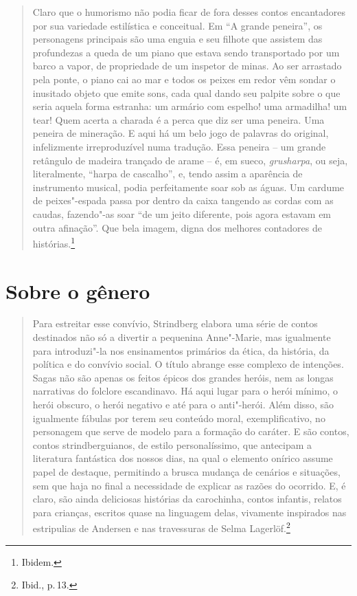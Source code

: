 \begin{quote}
Claro que o humorismo não podia ficar de fora desses contos encantadores
por sua variedade estilística e conceitual. Em ``A grande
peneira'', os personagens principais são uma enguia e seu filhote que
assistem das profundezas a queda de um piano que estava sendo
transportado por um barco a vapor, de propriedade de um inspetor de
minas. Ao ser arrastado pela ponte, o piano cai ao mar e todos os
peixes em redor vêm sondar o inusitado objeto que emite sons, cada qual
dando seu palpite sobre o que seria aquela forma estranha: um armário
com espelho! uma armadilha! um tear! Quem acerta a charada é a perca
que diz ser uma peneira. Uma peneira de mineração. E aqui há um belo
jogo de palavras do original, infelizmente irreproduzível numa
tradução. Essa peneira -- um grande retângulo de madeira trançado
de arame -- é, em sueco, \textit{grusharpa}, ou seja, literalmente,
``harpa de cascalho'', e, tendo assim a aparência de instrumento musical,
podia perfeitamente soar sob as águas. Um cardume de peixes"-espada
passa por dentro da caixa tangendo as cordas com as caudas,
fazendo"-as soar ``de um jeito diferente, pois agora estavam em outra
afinação''. Que bela imagem, digna dos melhores contadores de
histórias.\footnote{Ibidem.}
\end{quote}


\section{Sobre o gênero}

\begin{quote}
Para estreitar esse convívio, Strindberg elabora uma série de contos
destinados não só a divertir a pequenina Anne"-Marie, mas igualmente
para introduzi"-la nos ensinamentos primários da ética, da história,
da política e do convívio social. O título abrange esse complexo de
intenções. Sagas não são apenas os feitos épicos dos grandes heróis,
nem as longas narrativas do folclore escandinavo. Há aqui lugar para o
herói mínimo, o herói obscuro, o herói negativo e até para o
anti"-herói. Além disso, são igualmente fábulas por terem seu conteúdo
moral, exemplificativo, no personagem que serve de modelo para a
formação do caráter. E são contos, contos strindberguianos, de estilo
personalíssimo, que antecipam a literatura fantástica dos nossos dias,
na qual o elemento onírico assume papel de destaque, permitindo a
brusca mudança de cenários e situações, sem que haja no final a
necessidade de explicar as razões do ocorrido. E, é claro, são ainda
deliciosas histórias da carochinha, contos infantis, relatos para
crianças, escritos quase na linguagem delas, vivamente inspirados nas
estripulias de Andersen e nas travessuras de Selma Lagerlöf.\footnote{Ibid., p.\,13.}
\end{quote}

